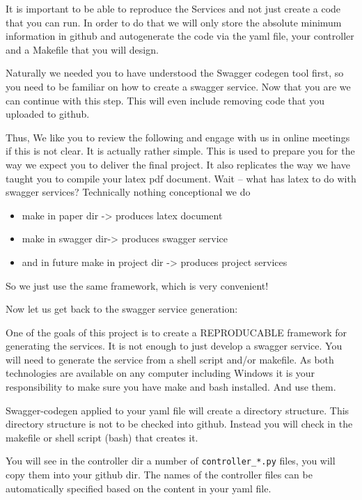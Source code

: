 \begin{exercise}
It is important to be able to reproduce the Services and not just
create a code that you can run. In order to do that we will only store
the absolute minimum information in github and autogenerate the code
via the yaml file, your controller and a Makefile that you will
design.

Naturally we needed you to have understood the Swagger codegen tool
first, so you need to be familiar on how to create a swagger service.
Now that you are we can continue with this step. This will even
include removing code that you uploaded to github.

Thus, We like you to review the following and engage with us in online
meetings if this is not clear. It is actually rather simple. This is
used to prepare you for the way we expect you to deliver the final
project. It also replicates the way we have taught you to compile your
latex pdf document. Wait -- what has latex to do with swagger services?
Technically nothing conceptional we do

 
\begin{itemize}
\item make in paper dir -> produces latex document

\item make in swagger dir-> produces swagger service

\item and in future make in project dir -> produces project services
\end{itemize}
 

So we just use the same framework, which is very convenient!

Now let us get back to the swagger service generation:
 
One of the goals of this project is to create a REPRODUCABLE framework
for generating the services. It is not enough to just develop a
swagger service. You will need to generate the service from a shell
script and/or makefile. As both technologies are available on any
computer including Windows it is your responsibility to make sure you
have make and bash installed. And use them.

Swagger-codegen applied to your yaml file will create a directory
structure. This directory structure is not to be checked into
github. Instead you will check in the makefile or shell script (bash)
that creates it.

You will see in the controller dir a number of \verb|controller_*.py|
files, you will copy them into your github dir. The names of the
controller files can be automatically specified based on the content
in your yaml file.


\end{exercise}
